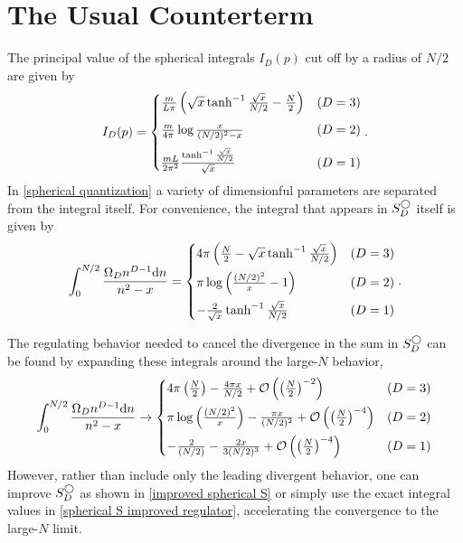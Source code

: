 \section{The Usual Counterterm}\label{sec:counterterm/spherical}

The principal value of the spherical integrals $I_D(p)$ cut off by a radius of $N/2$ are given by
\begin{equation}
    I_D(p) = \begin{cases}
        \frac{m}{L\pi}\left(\sqrt{x}\tanh^{-1}\frac{\sqrt{x}}{N/2} - \frac{N}{2}\right)
            &   (D=3)\\[0.25cm]
        \frac{m}{4\pi} \log \frac{x}{(N/2)^2-x}
            &   (D=2)\\[0.25cm]
        \frac{m L}{2\pi^2} \frac{\tanh^{-1} \frac{\sqrt{x}}{N/2}}{\sqrt{x}}                     &   (D=1)
    \end{cases}.
\end{equation}
In \eqref{spherical quantization} a variety of dimensionful parameters are separated from the integral itself.  For convenience, the integral that appears in $S_D^\bigcirc$ itself is given by
\begin{equation}
    \label{eq:spherical S improved regulator}
    \int_0^{N/2} \frac{\Omega_D n^{D-1} \mathrm{d}n}{n^2-x} = \begin{cases}
        4\pi\left( \frac{N}{2} - \sqrt{x} \tanh^{-1} \frac{\sqrt{x}}{N/2}\right)
            &   (D=3)\\[0.25cm]
        \pi \log\left( \frac{(N/2)^2}{x} - 1\right)
            &   (D=2)\\[0.25cm]
        -\frac{2}{\sqrt{x}} \tanh^{-1} \frac{\sqrt{x}}{N/2}                     &   (D=1)
    \end{cases}.
\end{equation}

The regulating behavior needed to cancel the divergence in the sum in $S_D^\bigcirc$ can be found by expanding these integrals around the large-$N$ behavior,
\begin{equation}
    \int_0^{N/2} \frac{\Omega_D n^{D-1} \mathrm{d}n}{n^2-x} \rightarrow \begin{cases}
        4\pi \left(\frac{N}{2}\right) - \frac{4 \pi x}{N/2} + \mathcal{O}\left(\left(\frac{N}{2}\right)^{-2}\right)
            &   (D=3)\\[0.25cm]
        \pi \log \left(\frac{(N/2)^2}{x}\right) - \frac{\pi x}{(N/2)^2} + \mathcal{O}\left(\left(\frac{N}{2}\right)^{-4}\right)
            &   (D=2)\\[0.25cm]
        -\frac{2}{(N/2)} - \frac{2 x}{3 (N/2)^3} + \mathcal{O}\left(\left(\frac{N}{2}\right)^{-4}\right)
            &   (D=1)
    \end{cases}
\end{equation}
However, rather than include only the leading divergent behavior, one can improve $S_D^\bigcirc$ as shown in \eqref{improved spherical S} or simply use the exact integral values in \eqref{spherical S improved regulator}, accelerating the convergence to the large-$N$ limit.

